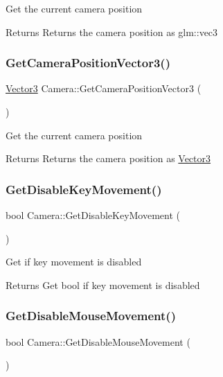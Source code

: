 Get the current camera position \begin{DoxyReturn}{Returns}
Returns the camera position as glm\+::vec3 
\end{DoxyReturn}
\mbox{\label{class_camera_a94319853194c76e195cc774c32f3bbf4}} 
\subsubsection{\texorpdfstring{GetCameraPositionVector3()}{GetCameraPositionVector3()}}
{\footnotesize\ttfamily \mbox{\hyperlink{struct_vector3}{Vector3}} Camera\+::\+Get\+Camera\+Position\+Vector3 (\begin{DoxyParamCaption}{ }\end{DoxyParamCaption})}

Get the current camera position \begin{DoxyReturn}{Returns}
Returns the camera position as \mbox{\hyperlink{struct_vector3}{Vector3}} 
\end{DoxyReturn}
\mbox{\label{class_camera_af6e034392072228fc4d6a80f1c3ea5bf}} 
\subsubsection{\texorpdfstring{GetDisableKeyMovement()}{GetDisableKeyMovement()}}
{\footnotesize\ttfamily bool Camera\+::\+Get\+Disable\+Key\+Movement (\begin{DoxyParamCaption}{ }\end{DoxyParamCaption})}

Get if key movement is disabled \begin{DoxyReturn}{Returns}
Get bool if key movement is disabled 
\end{DoxyReturn}
\mbox{\label{class_camera_a520757f86755ee458f4ccc1abb84297e}} 
\subsubsection{\texorpdfstring{GetDisableMouseMovement()}{GetDisableMouseMovement()}}
{\footnotesize\ttfamily bool Camera\+::\+Get\+Disable\+Mouse\+Movement (\begin{DoxyParamCaption}{ }\end{DoxyParamCaption})}

